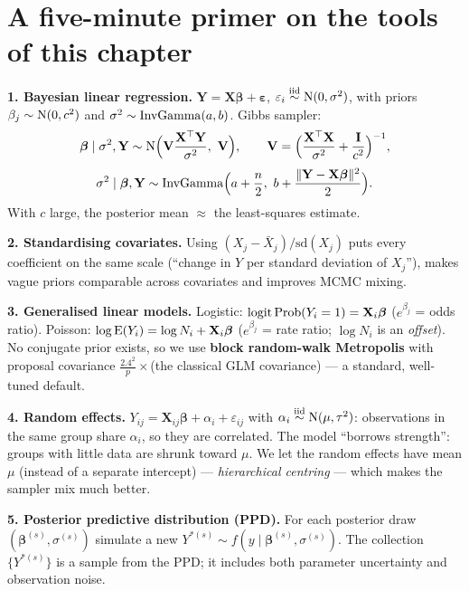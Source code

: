 \documentclass[11pt]{article}
\begin{document}
\section*{A five-minute primer on the tools of this chapter}

\begin{recall}
\textbf{1. Bayesian linear regression.} $\mathbf Y=\mathbf X\bm\beta+\bm\varepsilon$, $\varepsilon_i\stackrel{\text{iid}}{\sim}\mathrm{N}(0,\sigma^2)$, with priors $\beta_j\sim\mathrm{N}(0,c^2)$ and $\sigma^2\sim\mathrm{InvGamma}(a,b)$. Gibbs sampler:
\[
\bm\beta\mid\sigma^2,\mathbf Y\sim\dist N\Big(\mathbf V\frac{\mathbf X^\top\mathbf Y}{\sigma^2},\ \mathbf V\Big),\qquad \mathbf V=\Big(\frac{\mathbf X^\top\mathbf X}{\sigma^2}+\frac{\mathbf I}{c^2}\Big)^{-1},
\]
\[
\sigma^2\mid\bm\beta,\mathbf Y\sim\mathrm{InvGamma}\Big(a+\frac n2,\ b+\frac{\|\mathbf Y-\mathbf X\bm\beta\|^2}{2}\Big).
\]
With $c$ large, the posterior mean $\approx$ the least-squares estimate.

\medskip
\textbf{2. Standardising covariates.} Using $(X_j-\bar X_j)/\mathrm{sd}(X_j)$ puts every coefficient on the same scale (``change in $Y$ per standard deviation of $X_j$''), makes vague priors comparable across covariates and improves MCMC mixing.

\medskip
\textbf{3. Generalised linear models.} Logistic: $\mathrm{logit}\,\mathrm{Prob}(Y_i=1)=\mathbf X_i\bm\beta$ ($e^{\beta_j}$ = odds ratio). Poisson: $\log\mathrm{E}(Y_i)=\log N_i+\mathbf X_i\bm\beta$ ($e^{\beta_j}$ = rate ratio; $\log N_i$ is an \emph{offset}). No conjugate prior exists, so we use \textbf{block random-walk Metropolis} with proposal covariance $\frac{2.4^2}{p}\times$(the classical GLM covariance) --- a standard, well-tuned default.

\medskip
\textbf{4. Random effects.} $Y_{ij}=\mathbf X_{ij}\bm\beta+\alpha_i+\varepsilon_{ij}$ with $\alpha_i\stackrel{\text{iid}}{\sim}\mathrm{N}(\mu,\tau^2)$: observations in the same group share $\alpha_i$, so they are correlated. The model ``borrows strength'': groups with little data are shrunk toward $\mu$. We let the random effects have mean $\mu$ (instead of a separate intercept) --- \emph{hierarchical centring} --- which makes the sampler mix much better.

\medskip
\textbf{5. Posterior predictive distribution (PPD).} For each posterior draw $(\bm\beta^{(s)},\sigma^{(s)})$ simulate a new $Y^{*(s)}\sim f(y\mid\bm\beta^{(s)},\sigma^{(s)})$. The collection $\{Y^{*(s)}\}$ is a sample from the PPD; it includes both parameter uncertainty and observation noise.
\end{recall}
\end{document}
